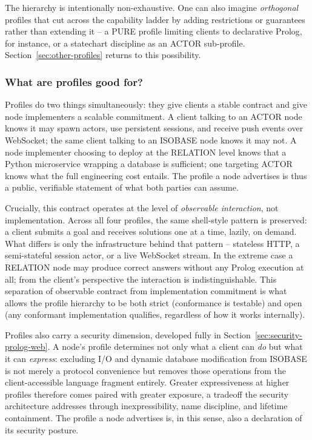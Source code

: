 The hierarchy is intentionally non-exhaustive. One can also imagine
\emph{orthogonal} profiles that cut across the capability ladder by adding
restrictions or guarantees rather than extending it -- a PURE profile
limiting clients to declarative Prolog, for instance, or a statechart
discipline as an ACTOR sub-profile. Section~\ref{sec:other-profiles}
returns to this possibility.


\subsubsection*{What are profiles good for?}\label{sec:profiles-why}

Profiles do two things simultaneously: they give clients a stable contract
and give node implementers a scalable commitment. A client talking to an
ACTOR node knows it may spawn actors, use persistent sessions, and receive
push events over WebSocket; the same client talking to an ISOBASE node
knows it may not. A node implementer choosing to deploy at the RELATION
level knows that a Python microservice wrapping a database is sufficient;
one targeting ACTOR knows what the full engineering cost entails. The
profile a node advertises is thus a public, verifiable statement of what
both parties can assume.

Crucially, this contract operates at the level of \emph{observable
interaction}, not implementation. Across all four profiles, the same
shell-style pattern is preserved: a client submits a goal and receives
solutions one at a time, lazily, on demand. What differs is only the
infrastructure behind that pattern -- stateless HTTP, a semi-stateful
session actor, or a live WebSocket stream. In the extreme case a
RELATION node may produce correct answers without any Prolog execution at
all; from the client's perspective the interaction is indistinguishable.
This separation of observable contract from implementation commitment is
what allows the profile hierarchy to be both strict (conformance is
testable) and open (any conformant implementation qualifies, regardless
of how it works internally).

Profiles also carry a security dimension, developed fully in
Section~\ref{sec:security-prolog-web}. A node's profile determines not
only what a client can \emph{do} but what it can \emph{express}: excluding
I/O and dynamic database modification from ISOBASE is not merely a
protocol convenience but removes those operations from the
client-accessible language fragment entirely. Greater expressiveness at
higher profiles therefore comes paired with greater exposure, a tradeoff
the security architecture addresses through inexpressibility, name
discipline, and lifetime containment. The profile a node advertises is,
in this sense, also a declaration of its security posture.

